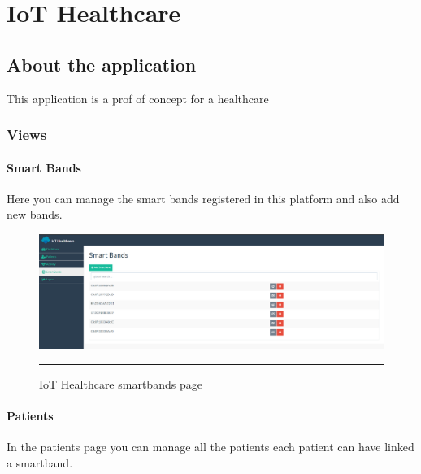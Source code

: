 
\chapter{IoT Healthcare} %

\label{IoT Healthcare} %


\section{About the application}

This application is a prof of concept for a healthcare 

\subsection{Views}

\subsubsection{Smart Bands}
Here you can manage the smart bands registered in this platform and also add new bands.
\begin{figure}[h!]
	\centering
	\includegraphics[width=1\textwidth]{./images/iothsmartbands}
	\rule{1\textwidth}{1pt}
	\caption{IoT Healthcare smartbands page}
\end{figure}


\subsubsection{Patients}
In the patients page you can manage all the patients each patient can have linked a smartband.

